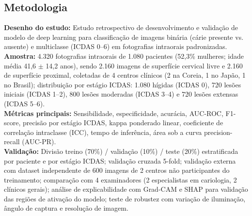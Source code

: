 \subsection{Metodologia}
\textbf{Desenho do estudo:} Estudo retrospectivo de desenvolvimento e
validação de modelo de deep learning para classificação de imagens
binária (cárie presente vs. ausente) e multiclasse (ICDAS 0--6) em
fotografias intraorais padronizadas. \\
\textbf{Amostra:} 4.320 fotografias intraorais de 1.080 pacientes
(52,3\% mulheres; idade média 41,6 $\pm$ 14,2 anos), sendo 2.160
imagens de superfície cervical livre e 2.160 de superfície proximal,
coletadas de 4 centros clínicos (2 na Coreia, 1 no Japão, 1 no
Brasil); distribuição por estágio ICDAS: 1.080 hígidas (ICDAS 0),
720 lesões iniciais (ICDAS 1--2), 800 lesões moderadas (ICDAS 3--4)
e 720 lesões extensas (ICDAS 5--6). \\
\textbf{Métricas principais:} Sensibilidade, especificidade, acurácia,
AUC-ROC, F1-score, precisão por estágio ICDAS, kappa ponderado linear,
coeficiente de correlação intraclasse (ICC), tempo de inferência,
área sob a curva precision-recall (AUC-PR). \\
\textbf{Validação:} Divisão treino (70\%) / validação (10\%) / teste
(20\%) estratificada por paciente e por estágio ICDAS; validação
cruzada 5-fold; validação externa com dataset independente de 600
imagens de 2 centros não participantes do treinamento; comparação
com 4 examinadores (2 especialistas em cariologia, 2 clínicos gerais);
análise de explicabilidade com Grad-CAM e SHAP para validação das
regiões de ativação do modelo; teste de robustez com variação de
iluminação, ângulo de captura e resolução de imagem.

